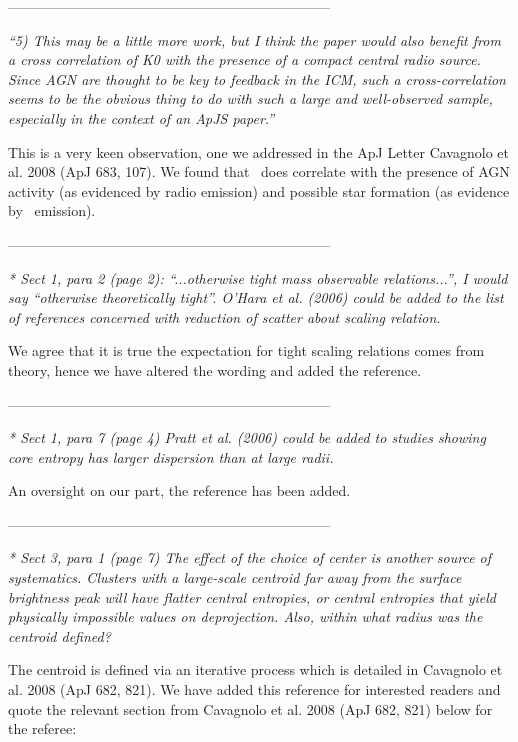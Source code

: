 \documentclass[11pt]{article}
\begin{document}
---------------------------------------------------------------------

{\it{``5) This may be a little more work, but I think the paper would
    also benefit from a cross correlation of K0 with the presence of a
    compact central radio source. Since AGN are thought to be key to
    feedback in the ICM, such a cross-correlation seems to be the
    obvious thing to do with such a large and well-observed sample,
    especially in the context of an ApJS paper.''}}

This is a very keen observation, one we addressed in the ApJ Letter
Cavagnolo et al. 2008 (ApJ 683, 107). We found that \kna\ does
correlate with the presence of AGN activity (as evidenced by radio
emission) and possible star formation (as evidence by \halpha\
emission).

---------------------------------------------------------------------

{\it{* Sect 1, para 2 (page 2): ``...otherwise tight mass observable
    relations...'', I would say ``otherwise theoretically tight''.
    O'Hara et al. (2006) could be added to the list of references
    concerned with reduction of scatter about scaling relation.}}

We agree that it is true the expectation for tight scaling relations
comes from theory, hence we have altered the wording and added the
reference.

---------------------------------------------------------------------

{\it{* Sect 1, para 7 (page 4) Pratt et al. (2006) could be added to
    studies showing core entropy has larger dispersion than at large
    radii.}}

An oversight on our part, the reference has been added.

---------------------------------------------------------------------

{\it{* Sect 3, para 1 (page 7) The effect of the choice of center is
    another source of systematics. Clusters with a large-scale
    centroid far away from the surface brightness peak will have
    flatter central entropies, or central entropies that yield
    physically impossible values on deprojection. Also, within what
    radius was the centroid defined?}}

The centroid is defined via an iterative process which is detailed in
Cavagnolo et al. 2008 (ApJ 682, 821). We have added this reference for
interested readers and quote the relevant section from Cavagnolo et
al. 2008 (ApJ 682, 821) below for the referee:
\end{document}
